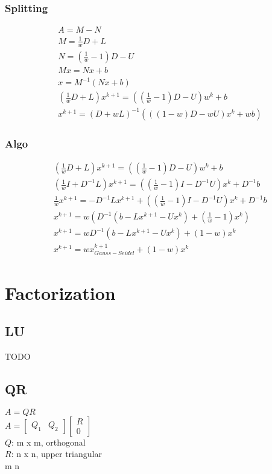 \documentclass[8pt,letter]{article}
\begin{document}
\begin{multicols*}{2}
    \subsubsection{Splitting}
    \begin{align*}
      & A = M - N\\
      & M = \frac{1}{w} D + L\\
      & N = (\frac{1}{w} - 1)D - U\\
      & Mx = Nx + b\\
      & x = M^{-1}(Nx + b)\\
      & (\frac{1}{w} D + L)x^{k+1} = ((\frac{1}{w}-1) D - U) w^k +b\\
      & x^{k+1} = (D+wL)^{-1} (((1-w)D - wU)x^k + wb)
    \end{align*}

    \subsubsection{Algo}
    \begin{align*}
      & (\frac{1}{w} D + L)x^{k+1} = ((\frac{1}{w}-1) D - U) w^k +b\\
      & (\frac{1}{w}I + D^{-1}L)x^{k+1} = ((\frac{1}{w} - 1)I - D^{-1}U)x^k + D^{-1}b\\
      & \frac{1}{w}x^{k+1} = -D^{-1}L x^{k+1} + ((\frac{1}{w} - 1)I - D^{-1}U)x^k + D^{-1}b\\
      & x^{k+1} = w(D^{-1}(b-Lx^{k+1}-Ux^k)+(\frac{1}{w}-1)x^k)\\
      & x^{k+1} = wD^{-1}(b-Lx^{k+1}-Ux^k)+(1-w)x^k\\
      & x^{k+1} = w x^{k+1}_{Gauss-Seidel} + (1-w)x^k
    \end{align*}
    
    \vfill\null
    \pagebreak
    
    \section{Factorization}
    
    \subsection{LU}
    TODO
    
    \subsection{QR}
    $A = QR$\\
    $A = \begin{bmatrix} Q_1 &Q_2 \end{bmatrix} \begin{bmatrix} R\\0 \end{bmatrix}$\\
    $Q$: m x m, orthogonal\\
    $R$: n x n, upper triangular\\
    m \geq n\\


\end{multicols*}
\end{document}
